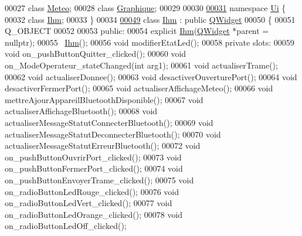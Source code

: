 \begin{DoxyCode}
00027 \textcolor{keyword}{class }\hyperlink{class_meteo}{Meteo};
00028 \textcolor{keyword}{class }\hyperlink{class_graphique}{Graphique};
00029 
00030 
\hypertarget{ihm_8h_source.tex_l00031}{}\hyperlink{namespace_ui}{00031} \textcolor{keyword}{namespace }\hyperlink{namespace_ui}{Ui} \{
00032 \textcolor{keyword}{class }\hyperlink{class_ihm}{Ihm};
00033 \}
00034 
\hypertarget{ihm_8h_source.tex_l00049}{}\hyperlink{class_ihm}{00049} \textcolor{keyword}{class }\hyperlink{class_ihm}{Ihm} : \textcolor{keyword}{public} \hyperlink{class_q_widget}{QWidget}
00050 \{
00051     Q\_OBJECT
00052 
00053 \textcolor{keyword}{public}:
00054     \textcolor{keyword}{explicit} \hyperlink{class_ihm}{Ihm}(\hyperlink{class_q_widget}{QWidget} *parent = \textcolor{keyword}{nullptr});    
00055     ~\hyperlink{class_ihm}{Ihm}();                                     
00056     \textcolor{keywordtype}{void} modifierEtatLed();                     
00058 \textcolor{keyword}{private} slots:
00059     \textcolor{keywordtype}{void} on\_pushButtonQuitter\_clicked();            
00060     \textcolor{keywordtype}{void} on\_ModeOperateur\_stateChanged(\textcolor{keywordtype}{int} arg1);   
00061     \textcolor{keywordtype}{void} actualiserTrame();                         
00062     \textcolor{keywordtype}{void} actualiserDonnee();                        
00063     \textcolor{keywordtype}{void} desactiverOuverturePort();                 
00064     \textcolor{keywordtype}{void} desactiverFermerPort();                    
00065     \textcolor{keywordtype}{void} actualiserAffichageMeteo();                
00066     \textcolor{keywordtype}{void} mettreAjourAppareilBluetoothDisponible();  
00067     \textcolor{keywordtype}{void} actualiserAffichageBluetooth();            
00068     \textcolor{keywordtype}{void} actualiserMessageStatutConnecterBluetooth();        
00069     \textcolor{keywordtype}{void} actualiserMessageStatutDeconnecterBluetooth();      
00070     \textcolor{keywordtype}{void} actualiserMessageStatutErreurBluetooth();           
00072     \textcolor{keywordtype}{void} on\_pushButtonOuvrirPort\_clicked();         
00073     \textcolor{keywordtype}{void} on\_pushButtonFermerPort\_clicked();         
00074     \textcolor{keywordtype}{void} on\_pushButtonEnvoyerTrame\_clicked();       
00075     \textcolor{keywordtype}{void} on\_radioButtonLedRouge\_clicked();          
00076     \textcolor{keywordtype}{void} on\_radioButtonLedVert\_clicked();           
00077     \textcolor{keywordtype}{void} on\_radioButtonLedOrange\_clicked();         
00078     \textcolor{keywordtype}{void} on\_radioButtonLedOff\_clicked();            

\end{DoxyCode}

